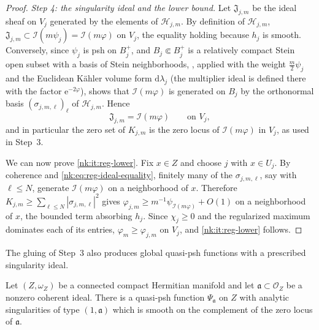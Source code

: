 \begin{proof}
\emph{Step 4: the singularity ideal and the lower bound.}
Let $\mathfrak J_{j,m}$ be the ideal sheaf on $V_j$ generated by the
elements of $\mathcal H_{j,m}$. By definition of $\mathcal H_{j,m}$,
$\mathfrak J_{j,m}\subset\mathcal I(m\psi_j)=\mathcal I(m\varphi)$ on $V_j$,
the equality holding because $h_j$ is smooth. Conversely, since
$\psi_j$ is psh on $B_j^+$, and $B_j\Subset B_j^+$ is a relatively
compact Stein open subset with a basis of Stein neighborhoods,
\cite[Proposition~1.2]{DEL00}, applied with the weight
$\tfrac m2\psi_j$ and the Euclidean K\"ahler volume form $\mathrm{d}\lambda_j$ (the
multiplier ideal is defined there with the factor
$\mathrm{e}^{-2\varphi}$), shows that $\mathcal I(m\varphi)$ is generated on
$B_j$ by the orthonormal basis $(\sigma_{j,m,\ell})_\ell$ of
$\mathcal H_{j,m}$. Hence
\begin{equation}\label{nk:eq:reg-ideal-equality}
  \mathfrak J_{j,m}=\mathcal I(m\varphi)\qquad\text{on }V_j ,
\end{equation}
and in particular the zero set of $K_{j,m}$ is the zero locus of
$\mathcal I(m\varphi)$ in $V_j$, as used in Step~3.
 
We can now prove \ref{nk:it:reg-lower}. Fix $x\in Z$ and choose $j$ with
$x\in U_j$. By coherence and \eqref{nk:eq:reg-ideal-equality}, finitely
many of the $\sigma_{j,m,\ell}$, say with $\ell\le N$, generate
$\mathcal I(m\varphi)$ on a neighborhood of $x$. Therefore
$K_{j,m}\ge\sum_{\ell\le N}|\sigma_{j,m,\ell}|^2$ gives
$\varphi_{j,m}\ge m^{-1}\psi_{\mathcal I(m\varphi)}+O(1)$
on a neighborhood of $x$, the bounded term absorbing $h_j$. Since
$\chi_j\ge0$ and the regularized maximum dominates each of its
entries, $\varphi_m\ge\varphi_{j,m}$ on $V_j$, and
\ref{nk:it:reg-lower} follows.
\end{proof}

The gluing of Step~3 also produces global quasi-psh functions with a
prescribed singularity ideal.

\begin{lemma}\label{nk:lem:ideal-function}
Let $(Z,\omega_Z)$ be a connected compact Hermitian manifold and let
$\mathfrak a\subset\mathcal O_Z$ be a nonzero coherent ideal. There is a
quasi-psh function
$\Psi_{\mathfrak a}$ on $Z$ with analytic singularities of type
$(1,\mathfrak a)$ which is smooth on the complement of the zero locus of
$\mathfrak a$.
\end{lemma}

